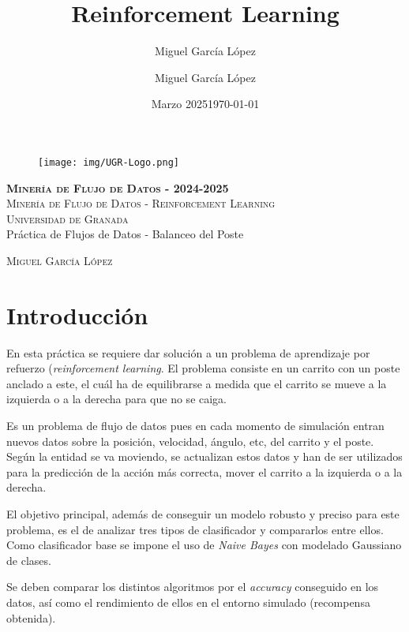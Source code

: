 \documentclass[12pt,letterpaper]{article}
\title{Reinforcement Learning}
\author{Miguel García López}
\date{Marzo 2025}
\author{Miguel García López} %
\date{\normalsize\today} %
\begin{document}
\begin{titlepage}
    \begin{figure}
        \vspace{-1.3cm}
        \begin{center}
            \texttt{[image: img/UGR-Logo.png]}
        \end{center}
    \end{figure}
    \vspace{1.3cm}
    \centering
    \normalfont \normalsize
    \textsc{\textbf{Minería de Flujo de Datos - 2024-2025} \\ \vspace{.15cm} Minería de Flujo de Datos - Reinforcement Learning\\ \vspace{.15cm} Universidad de Granada} \\ [25pt]
    \huge Práctica de Flujos de Datos - Balanceo del Poste

    \normalfont \normalsize \vspace{.30cm}
    \textsc{Miguel García López}

\end{titlepage}

\tableofcontents
\listoffigures
\listoftables
\newpage

\section{Introducción}
En esta práctica se requiere dar solución a un problema de aprendizaje por refuerzo (\textit{reinforcement learning}. El problema consiste en un carrito con un poste anclado a este, el cuál ha de equilibrarse a medida que el carrito se mueve a la izquierda o a la derecha para que no se caiga.

Es un problema de flujo de datos pues en cada momento de simulación entran nuevos datos sobre la posición, velocidad, ángulo, etc, del carrito y el poste. Según la entidad se va moviendo, se actualizan estos datos y han de ser utilizados para la predicción de la acción más correcta, mover el carrito a la izquierda o a la derecha.

El objetivo principal, además de conseguir un modelo robusto y preciso para este problema, es el de analizar tres tipos de clasificador y compararlos entre ellos. Como clasificador base se impone el uso de \textit{Naive Bayes} con modelado Gaussiano de clases.

Se deben comparar los distintos algoritmos por el \textit{accuracy} conseguido en los datos, así como el rendimiento de ellos en el entorno simulado (recompensa obtenida).
\end{document}
